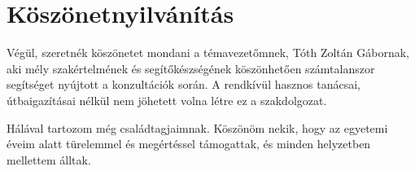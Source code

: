 \chapter*{Köszönetnyilvánítás}
Végül, szeretnék köszönetet mondani a témavezetőmnek, Tóth Zoltán Gábornak, aki mély szakértelmének és segítőkészségének köszönhetően számtalanszor segítséget nyújtott a konzultációk során. A rendkívül hasznos tanácsai, útbaigazításai nélkül nem jöhetett volna létre ez a szakdolgozat.
\par Hálával tartozom még családtagjaimnak. Köszönöm nekik, hogy az egyetemi éveim alatt türelemmel és megértéssel támogattak, és minden helyzetben mellettem álltak.


